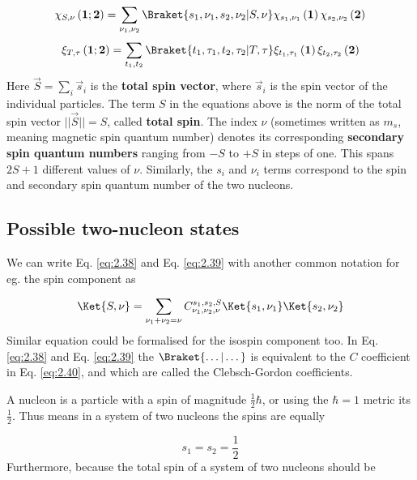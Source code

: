 \begin{equation} \label{eq:2.38}
	\chi_{S,\nu} \left( \boldsymbol{1}; \boldsymbol{2} \right)
	=
	\sum_{\nu_{1}, \nu_{2}} \Braket{s_{1}, \nu_{1}, s_{2}, \nu_{2}|S, \nu}
	\chi_{s_{1}, \nu_{1}} \left( \boldsymbol{1} \right) \chi_{s_{2}, \nu_{2}} \left( \boldsymbol{2} \right)
\end{equation}
\begin{equation} \label{eq:2.39}
	\xi_{T,\tau} \left( \boldsymbol{1}; \boldsymbol{2} \right)
	=
	\sum_{t_{1}, t_{2}} \Braket{t_{1}, \tau_{1}, t_{2}, \tau_{2}|T, \tau}
	\xi_{t_{1}, \tau_{1}} \left( \boldsymbol{1} \right) \xi_{t_{2}, \tau_{2}} \left( \boldsymbol{2} \right)
\end{equation}
Here $\vec{S} = \sum_{i} \vec{s}_{i}$ is the \textbf{total spin vector}, where $\vec{s}_{i}$ is the spin vector of the individual particles. The term $S$ in the equations above is the norm of the total spin vector $|| \vec{S} || = S$, called \textbf{total spin}. The index $\nu$ (sometimes written as $m_{s}$, meaning magnetic spin quantum number) denotes its corresponding \textbf{secondary spin quantum numbers} ranging from $-S$ to $+S$ in steps of one. This spans $2S + 1$ different values of $\nu$. Similarly, the $s_{i}$ and $\nu_{i}$ terms correspond to the spin and secondary spin quantum number of the two nucleons. 

\subsection{Possible two-nucleon states}
We can write Eq. \eqref{eq:2.38} and Eq. \eqref{eq:2.39} with another common notation for eg. the spin component as

\begin{equation} \label{eq:2.40}
	\Ket{S, \nu}
	=
	\sum_{\nu_{1}+\nu_{2} = \nu}
	C_{\nu_{1}, \nu_{2}, \nu}^{s_{1}, s_{2}, S} \Ket{s_{1}, \nu_{1}} \Ket{s_{2}, \nu_{2}}
\end{equation}
Similar equation could be formalised for the isospin component too. In Eq. \eqref{eq:2.38} and Eq. \eqref{eq:2.39} the $\Braket{\dots | \dots}$ is equivalent to the $C$ coefficient in Eq. \eqref{eq:2.40}, and which are called the Clebsch-Gordon coefficients. \par
A nucleon is a particle with a spin of magnitude $\frac{1}{2} \hbar$, or using the $\hbar = 1$ metric its $\frac{1}{2}$. Thus means in a system of two nucleons the spins are equally

\begin{equation*}
	s_{1} = s_{2} = \frac{1}{2}
\end{equation*}
Furthermore, because the total spin of a system of two nucleons should be

